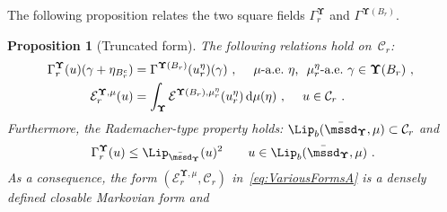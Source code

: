 \documentclass[11pt,letterpaper]{amsart}
\newcommand{\A}{\Sigma} %
\renewcommand{\complement}{\mathrm{c}}
\DeclareMathOperator{\eqdef}{\coloneqq}
\newcommand{\diff}{\mathop{}\!\mathrm{d}}
\newcommand{\ttonde}[1]{\big({#1}\big)}
\newcommand{\TLDS}{\textsc{tlds}\xspace}
\newcommand{\comma}{\,\,\mathrm{,}\;\,}
\newcommand{\fstop}{\,\,\mathrm{.}}
\newcommand{\cdc}{\Gamma}
\newcommand{\purple}[1]{{\color{purple}#1}}
\newcommand{\QP}{{\mu}}
\newcommand{\dUpsilon}{{\mathbf \Upsilon}}
\newcommand{\U}{\dUpsilon}
\newcommand{\E}{\mathcal E}
\renewcommand{\1}{\mathbf 1}
\renewcommand{\msE}{\mathscr K}
\numberwithin{equation}{section}
\theoremstyle{plain}
\newtheorem{prop}[thm]{Proposition}%
\theoremstyle{definition}
\theoremstyle{remark}
\begin{document}
The following proposition relates the two square fields $\cdc^{\U}_r$ and $\cdc^{\U(B_r)}$. %
\begin{prop}[Truncated form]%
\label{t:ClosabilitySecond} 
The following relations hold on~$\mathcal C_r$: 
\begin{align}\label{eq:p:MarginalWP:0}
\cdc^{\dUpsilon}_r(u)(\gamma+\eta_{B_r^c}) &= \cdc^{\dUpsilon(B_r)}(u_{r}^\eta)(\gamma) \comma \quad \text{$\QP$-a.e.~$\eta$, \ $\mu_{r}^\eta$-a.e.~$\gamma \in \U(B_r)$}  \comma
\\
\E_{r}^{\U, \mu}(u) &=\int_\dUpsilon  \E^{\U(B_r), \mu_r^\eta}(u_{r}^\eta) \diff\QP(\eta)\comma \quad u \in \mathcal C_r\fstop \notag
\end{align}
Furthermore, the Rademacher-type property holds: $\Lip_b(\bar{\mssd}_\U, \QP)\subset \mathcal C_r$ and 
\begin{align}\label{p:Rad}
 \cdc^\U_r(u) \le \Lip_{\bar{\mssd}_\U}(u)^2 \qquad u \in \Lip_b(\bar{\mssd}_\U, \QP) \fstop
\end{align}
As a consequence, the form $(\E^{\U, \QP}_{r}, \mathcal C_r)$ in~\eqref{eq:VariousFormsA}  is a densely defined closable Markovian form and 

\end{prop}
\end{document}
